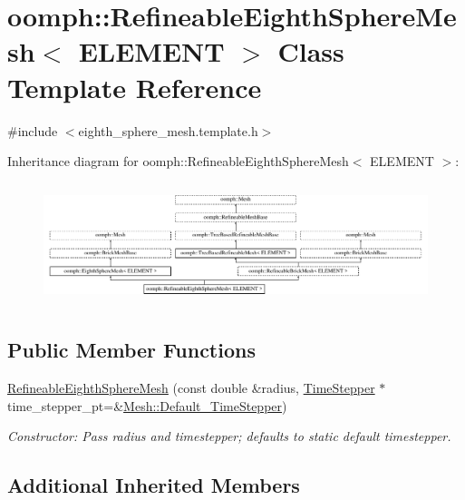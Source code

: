 \hypertarget{classoomph_1_1RefineableEighthSphereMesh}{}\section{oomph\+:\+:Refineable\+Eighth\+Sphere\+Mesh$<$ E\+L\+E\+M\+E\+NT $>$ Class Template Reference}
\label{classoomph_1_1RefineableEighthSphereMesh}


{\ttfamily \#include $<$eighth\+\_\+sphere\+\_\+mesh.\+template.\+h$>$}

Inheritance diagram for oomph\+:\+:Refineable\+Eighth\+Sphere\+Mesh$<$ E\+L\+E\+M\+E\+NT $>$\+:\begin{figure}[H]
\begin{center}
\leavevmode
\includegraphics[height=3.589744cm]{classoomph_1_1RefineableEighthSphereMesh}
\end{center}
\end{figure}
\subsection*{Public Member Functions}
\begin{DoxyCompactItemize}
\item 
\hyperlink{classoomph_1_1RefineableEighthSphereMesh_a975d12a45de7356f50bd69f3197659aa}{Refineable\+Eighth\+Sphere\+Mesh} (const double \&radius, \hyperlink{classoomph_1_1TimeStepper}{Time\+Stepper} $\ast$time\+\_\+stepper\+\_\+pt=\&\hyperlink{classoomph_1_1Mesh_a12243d0fee2b1fcee729ee5a4777ea10}{Mesh\+::\+Default\+\_\+\+Time\+Stepper})
\begin{DoxyCompactList}\small\item\em Constructor\+: Pass radius and timestepper; defaults to static default timestepper. \end{DoxyCompactList}\end{DoxyCompactItemize}
\subsection*{Additional Inherited Members}


